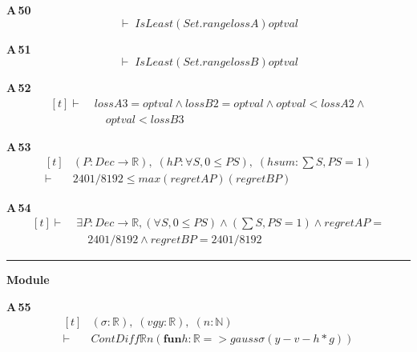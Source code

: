 \noindent\textbf{A\,50}\quad{}
{\footnotesize\[ \vdash\; \mathit{IsLeast} (\mathit{Set}.\mathit{range} \mathit{lossA}) \mathit{optval} \]}

\noindent\textbf{A\,51}\quad{}
{\footnotesize\[ \vdash\; \mathit{IsLeast} (\mathit{Set}.\mathit{range} \mathit{lossB}) \mathit{optval} \]}

\noindent\textbf{A\,52}\quad{}
{\footnotesize\[ \begin{aligned}[t]
\vdash\;&\mathit{lossA} 3 = \mathit{optval} \wedge \mathit{lossB} 2 = \mathit{optval} \wedge \mathit{optval} < \mathit{lossA} 2 \wedge\\
&\quad \mathit{optval} < \mathit{lossB} 3
\end{aligned} \]}

\noindent\textbf{A\,53}\quad{}
{\footnotesize\[ \begin{aligned}[t]
&(\mathit{P} : \mathit{Dec} \to \mathbb{R} ),\; (\mathit{hP} : \forall \mathit{S}, 0 \leq \mathit{P} \mathit{S}),\; (\mathit{hsum} : \textstyle\sum \mathit{S}, \mathit{P} \mathit{S} = 1)\\
\vdash\;&2401/8192 \leq \mathit{max} (\mathit{regretA} \mathit{P}) (\mathit{regretB} \mathit{P})
\end{aligned} \]}

\noindent\textbf{A\,54}\quad{}
{\footnotesize\[ \begin{aligned}[t]
\vdash\;&\exists \mathit{P} : \mathit{Dec} \to \mathbb{R} , (\forall \mathit{S}, 0 \leq \mathit{P} \mathit{S}) \wedge (\textstyle\sum \mathit{S}, \mathit{P} \mathit{S} = 1) \wedge \mathit{regretA} \mathit{P} =\\
&\quad 2401/8192 \wedge \mathit{regretB} \mathit{P} = 2401/8192
\end{aligned} \]}

\vspace{4pt}\noindent\rule{\columnwidth}{0.4pt}\par\vspace{2pt}
\noindent\textbf{Module }\par\vspace{3pt}

\noindent\textbf{A\,55}\quad{}
{\footnotesize\[ \begin{aligned}[t]
&(\sigma : \mathbb{R} ),\; (\mathit{v} \mathit{g} \mathit{y} : \mathbb{R} ),\; (\mathit{n} : \mathbb{N} )\\
\vdash\;&\mathit{ContDiff} \mathbb{R} \mathit{n} (\mathbf{fun} \mathit{h} : \mathbb{R} => \mathit{gauss} \sigma (\mathit{y} - \mathit{v} - \mathit{h} * \mathit{g}))
\end{aligned} \]}


